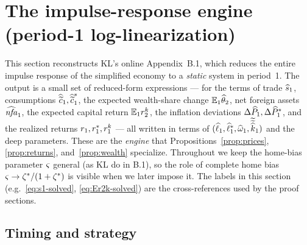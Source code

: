 \section{The impulse-response engine (period-1 log-linearization)}
\label{sec:engine}

This section reconstructs KL's online Appendix~B.1, which reduces the entire
impulse response of the simplified economy to a \emph{static} system in
period~1. The output is a small set of reduced-form expressions --- for the
terms of trade $\widehat{s}_1$, consumptions $\widehat{\widetilde{c}}_1,\widehat{\widetilde{c}}^{*}_1$,
the expected wealth-share change $\mathbb{E}_1\widehat{\theta}_2$, net foreign assets
$\widehat{\mathit{nfa}}_1$, the expected capital return $\mathbb{E}_1r^{k}_2$, the inflation
deviations $\Delta\widehat{P}_1,\Delta\widehat{P}^{*}_1$, and the realized returns
$r_1,r^{*}_1,r^{k}_1$ --- all written in terms of
$(\widehat{\ell}_1,\widehat{\ell}^{*}_1,\widehat{\omega}_1,\widetilde{\widetilde{\widehat{k}}}_1)$
and the deep parameters. These are the \emph{engine} that
Propositions~\ref{prop:prices}, \ref{prop:returns}, and~\ref{prop:wealth}
specialize. Throughout we keep the home-bias parameter $\varsigma$ general (as KL
do in B.1), so the role of complete home bias $\varsigma\to\zeta^{*}/(1+\zeta^{*})$ is visible
when we later impose it. The labels in this section (e.g.\
\eqref{eq:s1-solved}, \eqref{eq:Er2k-solved}) are the cross-references used by
the proof sections.

\subsection{Timing and strategy}
\label{sec:engine-timing}

